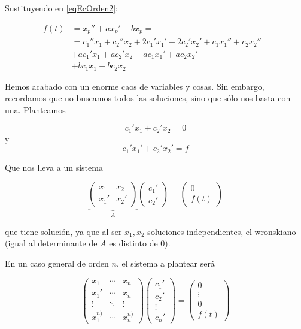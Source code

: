\documentclass[nochap]{apuntes}
\begin{document}
Sustituyendo en \eqref{eqEcOrden2}:

\begin{align*}
f(t) &= x_p'' + ax_p' + bx_p = &  \\
	&= c_1''x_1 + c_2''x_2 + 2c_1'x_1' + 2c_2'x_2'  + c_1x_1''  + c_2x_2'' \\
	& + ac_1' x_1 + ac_2'x_2  + ac_1x_1'  + ac_2x_2' \\
	&  + bc_1x_1  + bc_2x_2 
\end{align*}

Hemos acabado con un enorme caos de variables y cosas. Sin embargo, recordamos que no buscamos todos las soluciones, sino que sólo nos basta con una. Planteamos 

\[ c_1'x_1 + c_2'x_2 = 0 \] y \[ c_1'x_1' + c_2'x_2' = f \]
 
Que nos lleva a un sistema

\[ \underbrace{\begin{pmatrix}
x_1 & x_2 \\
x_1' & x_2' 
\end{pmatrix}}_A\begin{pmatrix}
c_1' \\ c_2'
\end{pmatrix} = \begin{pmatrix}
0 \\ f(t)
\end{pmatrix} \] 

que tiene solución, ya que al ser $x_1,x_2$ soluciones independientes, el wronskiano (igual al determinante de $A$ es distinto de $0$).

En un caso general de orden $n$, el sistema a plantear será

\[ \begin{pmatrix}
x_1 & \cdots & x_n \\
x_1' & \cdots & x_n \\
\vdots & \ddots & \vdots \\
x_1^{n)} & \cdots & x_n^{n)}
\end{pmatrix} \begin{pmatrix} c_1' \\ c_2' \\ \vdots \\ c_n' \end{pmatrix} 
= 
\begin{pmatrix}
0 \\ \vdots \\ 0 \\ f(t)
\end{pmatrix} \]
\end{document}
